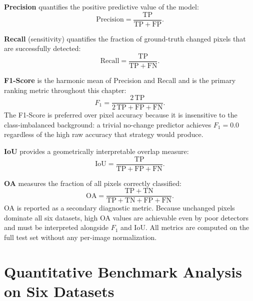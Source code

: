 \noindent\textbf{Precision} quantifies the positive predictive value of the model:
\begin{equation}
\mathrm{Precision} = \frac{\mathrm{TP}}{\mathrm{TP} + \mathrm{FP}}.
\label{eq:exp_precision}
\end{equation}

\noindent\textbf{Recall} (sensitivity) quantifies the fraction of ground-truth changed pixels that are successfully detected:
\begin{equation}
\mathrm{Recall} = \frac{\mathrm{TP}}{\mathrm{TP} + \mathrm{FN}}.
\label{eq:exp_recall}
\end{equation}

\noindent\textbf{F1-Score} is the harmonic mean of Precision and Recall and is the primary ranking metric throughout this chapter:
\begin{equation}
F_1 = \frac{2\,\mathrm{TP}}{2\,\mathrm{TP} + \mathrm{FP} + \mathrm{FN}}.
\label{eq:exp_f1}
\end{equation}
The F1-Score is preferred over pixel accuracy because it is insensitive to the class-imbalanced background: a trivial no-change predictor achieves $F_1 = 0.0$ regardless of the high raw accuracy that strategy would produce.

\noindent\textbf{\ac{IoU}} provides a geometrically interpretable overlap measure:
\begin{equation}
\mathrm{IoU} = \frac{\mathrm{TP}}{\mathrm{TP} + \mathrm{FP} + \mathrm{FN}}.
\label{eq:exp_iou}
\end{equation}

\noindent\textbf{\ac{OA}} measures the fraction of all pixels correctly classified:
\begin{equation}
\mathrm{OA} = \frac{\mathrm{TP} + \mathrm{TN}}
               {\mathrm{TP} + \mathrm{TN} + \mathrm{FP} + \mathrm{FN}}.
\label{eq:exp_oa}
\end{equation}
\ac{OA} is reported as a secondary diagnostic metric. Because unchanged pixels dominate all six datasets, high \ac{OA} values are achievable even by poor detectors and must be interpreted alongside $F_1$ and \ac{IoU}. All metrics are computed on the full test set without any per-image normalization.


\section{Quantitative Benchmark Analysis on Six Datasets}
\label{sec:exp-quantitative}

